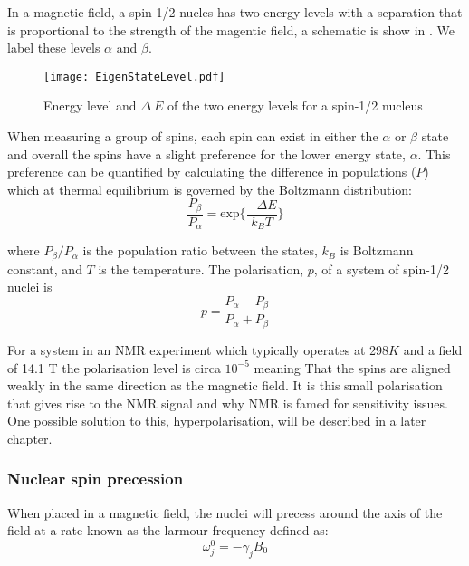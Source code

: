 In a magnetic field, a spin-1/2 nucles has two energy levels with a separation that is proportional to the strength of the magentic field, a schematic is show in . We label these levels $\alpha$ and $\beta$.

\begin{figure}
  \begin{center}
  \texttt{[image: EigenStateLevel.pdf]}
  \end{center}
  \caption{Energy level and $\Delta~E$ of the two energy levels for a spin-1/2 nucleus}
  \label{fig:EnergySplit}
\end{figure}

When measuring a group of spins, each spin can exist in either the $\alpha$ or $\beta$ state and overall
the spins have a slight preference for the lower energy state, $\alpha$. This preference can be quantified
by calculating the difference in populations ($P$) which at thermal equilibrium is governed by the
Boltzmann distribution:
\begin{equation}\label{eqn:Boltzmann}
  \frac{P_{\beta}}{P_{\alpha}} = \text{exp}\{\frac{-\Delta{E}}{k_B T}\}
\end{equation}

where $P_{\beta}/P_{\alpha}$ is the population ratio between the states, $k_B$ is Boltzmann constant, and $T$ is the temperature. The polarisation, $p$, of a system of
spin-1/2 nuclei is
\begin{equation}\label{eqn:Polarisation}
  p = \frac{P_\alpha - P_\beta}{P_\alpha + P_\beta}
\end{equation}

For a system in an NMR experiment which typically operates at 298$K$ and
a field of 14.1 T the polarisation level is circa $10^{-5}$ meaning That the spins are aligned weakly in the same direction as the magnetic field. It is this small polarisation that gives rise to the NMR signal and why NMR is famed for sensitivity
issues. One possible solution to this, hyperpolarisation, will be described in a later chapter.

\subsubsection{Nuclear spin precession}

When placed in a magnetic field, the nuclei will precess around the axis of the field at a rate known as the larmour frequency defined as:
\begin{equation}\label{eqn:larmour}
  \omega_j^0 = -\gamma_jB_0
\end{equation}

